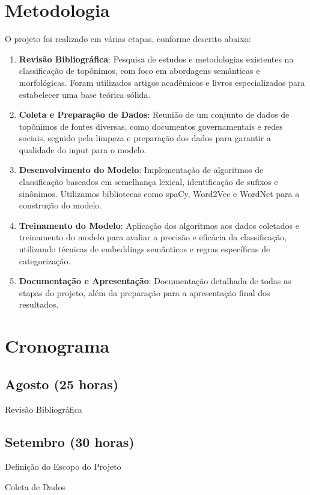 \documentclass{article}
\begin{document}
\section*{Metodologia}
O projeto foi realizado em várias etapas, conforme descrito abaixo:
\begin{enumerate}
\item \textbf{Revisão Bibliográfica}: Pesquisa de estudos e metodologias existentes na classificação de topônimos, com foco em abordagens semânticas e morfológicas. Foram utilizados artigos acadêmicos e livros especializados para estabelecer uma base teórica sólida.
\item \textbf{Coleta e Preparação de Dados}: Reunião de um conjunto de dados de topônimos de fontes diversas, como documentos governamentais e redes sociais, seguido pela limpeza e preparação dos dados para garantir a qualidade do input para o modelo.
\item \textbf{Desenvolvimento do Modelo}: Implementação de algoritmos de classificação baseados em semelhança lexical, identificação de sufixos e sinônimos. Utilizamos bibliotecas como spaCy, Word2Vec e WordNet para a construção do modelo.
\item \textbf{Treinamento do Modelo}: Aplicação dos algoritmos aos dados coletados e treinamento do modelo para avaliar a precisão e eficácia da classificação, utilizando técnicas de embeddings semânticos e regras específicas de categorização.
\item \textbf{Documentação e Apresentação}: Documentação detalhada de todas as etapas do projeto, além da preparação para a apresentação final dos resultados.
\end{enumerate}

\section*{Cronograma}
\subsection*{Agosto (25 horas)}

Revisão Bibliográfica

\subsection*{Setembro (30 horas)}

Definição do Escopo do Projeto

Coleta de Dados
\end{document}
